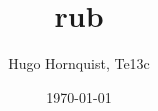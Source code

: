 \documentclass[11pt, a4paper]{article}
\author{Hugo Hornquist, Te13c}
\date{\today}
\title{rub}
\begin{document}
\maketitle


	
\begin{comment}
\begin{thebibliography}{9}
\bibitem{Key}
	Example Name,
	Title
\end{thebibliography}
\end{comment}
%
%
\end{document}
